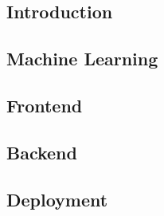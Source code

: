 \documentclass[preview]{standalone}
\begin{document}
\subsection{Introduction}


\subsection{Machine Learning}


\subsection{Frontend}


\subsection{Backend}


\subsection{Deployment}

\end{document}
